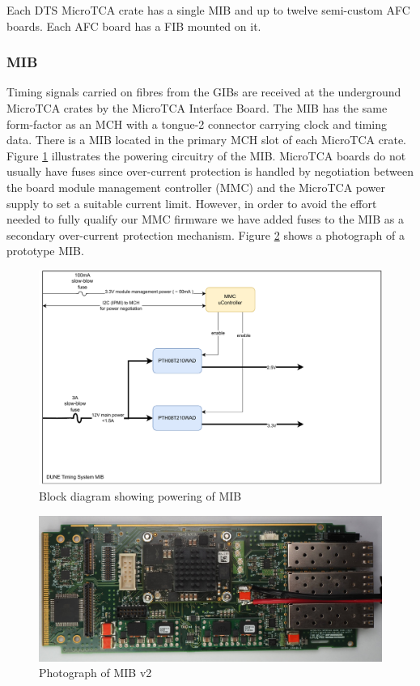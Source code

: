 \documentclass[fleqn,12pt,a4paper]{olplainarticle}
\begin{document}
Each DTS MicroTCA crate has a single MIB and up to twelve semi-custom AFC boards. Each AFC board has a FIB mounted on it.

\subsubsection{MIB}

Timing signals carried on fibres from the GIBs are received at the underground MicroTCA crates by the MicroTCA Interface Board. The MIB has the same form-factor as an MCH with a tongue-2 connector carrying clock and timing data. There is a MIB located in the primary MCH slot of each MicroTCA crate. Figure \ref{fig:dts-mib-powering} illustrates the powering circuitry of the MIB. MicroTCA boards do not usually have fuses since over-current protection is handled by negotiation between the board module management controller (MMC) and the MicroTCA power supply to set a suitable current limit. However, in order to avoid the effort needed to fully qualify our MMC firmware we have added fuses to the MIB as a secondary over-current protection mechanism. Figure \ref{fig:dts-mib-photo} shows a photograph of a prototype MIB.

\begin{figure}
  \centering
  \includegraphics[width=\linewidth]{dts_mib_power_block_diagram_v1-231215.drawio.pdf}
  \caption{Block diagram showing powering of MIB}
  \label{fig:dts-mib-powering}
\end{figure}

\begin{figure}
  \centering
  \includegraphics[width=\linewidth]{mib_photo_P8180060.JPG}
  \caption{Photograph of MIB v2}
  \label{fig:dts-mib-photo}
\end{figure}
\end{document}
